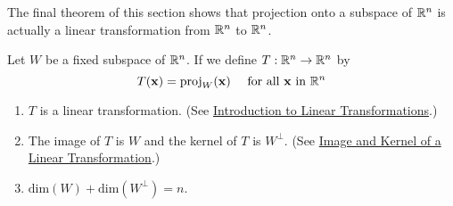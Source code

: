 \documentclass{ximera}
\begin{document}
The final theorem of this section shows that projection onto a subspace of $\mathbb{R}^n$ is actually a linear transformation from $\mathbb{R}^n$ to $\mathbb{R}^n$.

\begin{theorem}\label{th:ProjLinTran}
Let $W$ be a fixed subspace of $\mathbb{R}^n$. If we define $T : \mathbb{R}^n \to \mathbb{R}^n$ by
\begin{equation*}
T(\mathbf{x}) = \mbox{proj}_W(\mathbf{x}) \quad \mbox{ for all }\mathbf{x}\mbox{ in }\mathbb{R}^n
\end{equation*}
\begin{enumerate}
\item\label{th:ProjLinTran_a} $T$ is a linear transformation.  (See \href{https://ximera.osu.edu/oerlinalg/LinearAlgebra/LTR-0010/main}{Introduction to Linear Transformations}.)

\item\label{th:ProjLinTran_b} The image of $T$ is $W$ and the kernel of $T$ is $ W^\perp$.  (See \href{https://ximera.osu.edu/oerlinalg/LinearAlgebra/LTR-0050/main}{Image and Kernel of a Linear Transformation}.)

\item\label{th:ProjLinTran_c} $\mbox{dim}(W) + \mbox{dim}(W^\perp) = n$.

\end{enumerate}
\end{theorem}
\end{document}
